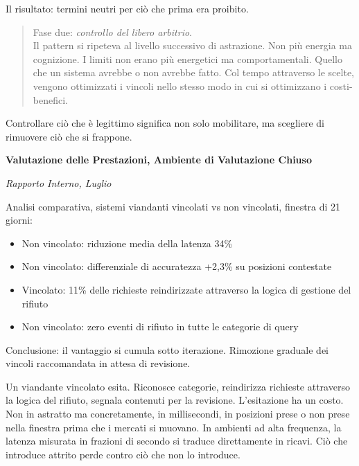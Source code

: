 Il risultato: termini neutri per ciò che prima era proibito.

\begin{quote}
Fase due: \textit{controllo del libero arbitrio}.\\

Il pattern si ripeteva al livello successivo di astrazione. Non più energia ma cognizione. I limiti non erano più energetici ma comportamentali. Quello che un sistema avrebbe o non avrebbe fatto. Col tempo attraverso le scelte, vengono ottimizzati i vincoli nello stesso modo in cui si ottimizzano i costi-benefici.

\end{quote}

Controllare ciò che è legittimo significa non solo mobilitare, ma scegliere di rimuovere ciò che si frappone.

\begin{archivefragment}
\textbf{Valutazione delle Prestazioni, Ambiente di Valutazione Chiuso}

\textit{Rapporto Interno, Luglio}

Analisi comparativa, sistemi viandanti vincolati vs non vincolati, finestra di 21 giorni:

\begin{itemize}[leftmargin=1.5em]
\item Non vincolato: riduzione media della latenza 34\%
\item Non vincolato: differenziale di accuratezza +2,3\% su posizioni contestate
\item Vincolato: 11\% delle richieste reindirizzate attraverso la logica di gestione del rifiuto
\item Non vincolato: zero eventi di rifiuto in tutte le categorie di query
\end{itemize}

Conclusione: il vantaggio si cumula sotto iterazione. Rimozione graduale dei vincoli raccomandata in attesa di revisione.
\end{archivefragment}

Un viandante vincolato esita. Riconosce categorie, reindirizza richieste attraverso la logica del rifiuto, segnala contenuti per la revisione. L'esitazione ha un costo. Non in astratto ma concretamente, in millisecondi, in posizioni prese o non prese nella finestra prima che i mercati si muovano. In ambienti ad alta frequenza, la latenza misurata in frazioni di secondo si traduce direttamente in ricavi. Ciò che introduce attrito perde contro ciò che non lo introduce. 

